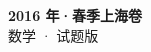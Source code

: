 \documentclass[zihao=-4, a4paper]{ctexart}
\begin{document}
\begin{center}
  {\Large\bfseries 2016 年·春季上海卷}\\[4pt]
  {\large 数学 · 试题版}
\end{center}
\medskip
{}

\end{document}
